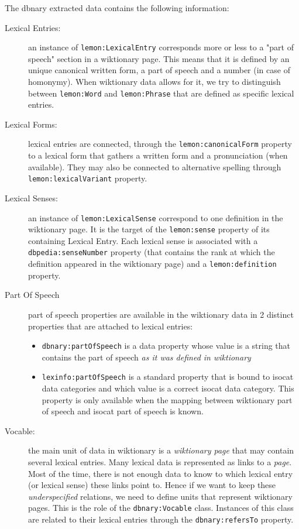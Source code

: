 \documentclass[sw]{iosart2c}
\begin{document}
The dbnary extracted data contains the following information:

\begin{description}
\item[Lexical Entries:] an instance of \texttt{lemon:LexicalEntry} corresponds more or less to a "part of speech" section in a wiktionary page. This means that it is defined by an unique canonical written form, a part of speech and a number (in case of homonymy). When wiktionary data allows for it, we try to distinguish between \texttt{lemon:Word} and \texttt{lemon:Phrase} that are defined as specific lexical entries.
\item[Lexical Forms:] lexical entries are connected, through the \texttt{lemon:canonicalForm} property to a lexical form that gathers a written form and a pronunciation (when available). They may also be connected to alternative spelling through \texttt{lemon:lexicalVariant} property. 
\item[Lexical Senses:] an instance of \texttt{lemon:LexicalSense} correspond to one definition in the wiktionary page. It is the target of the \texttt{lemon:sense} property of its containing Lexical Entry. Each lexical sense is associated with a \texttt{dbpedia:senseNumber} property (that contains the rank at which the definition appeared in the wiktionary page) and a \texttt{lemon:definition} property.
\item[Part Of Speech] part of speech properties are available in the wiktionary data in 2 distinct properties that are attached to lexical entries:
\begin{itemize}
\item \texttt{dbnary:partOfSpeech} is a data property whose value is a string that contains the part of speech \textit{as it was defined in wiktionary} 
\item \texttt{lexinfo:partOfSpeech} is a standard property that is bound to isocat data categories and which value is a correct isocat data category. This property is only available when the mapping between wiktionary part of speech and isocat part of speech is known.
\end{itemize}
\item[Vocable:] the main unit of data in wiktionary is a \textit{wiktionary page} that may contain several lexical entries. Many lexical data is represented as links to a \textit{page}. Most of the time, there is not enough data to know to which lexical entry (or lexical sense) these links point to. Hence if we want to keep these \textit{underspecified} relations, we need to define units that represent wiktionary pages. This is the role of the \texttt{dbnary:Vocable} class. Instances of this class are related to their lexical entries through the \texttt{dbnary:refersTo} property. 

\end{description}
\end{document}
